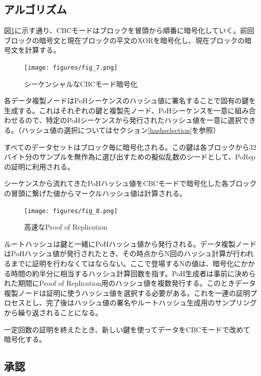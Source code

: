 \documentclass[12pt]{ltjsarticle}
\begin{document}
\subsection{アルゴリズム}
図\ref{fig:encrypt}に示す通り、CBCモードはブロックを冒頭から順番に暗号化していく。前回ブロックの暗号文と現在ブロックの平文のXORを暗号化し、現在ブロックの暗号文を計算する。

\begin{figure}
  \begin{center}
    \centering
    \texttt{[image: figures/fig\_7.png]}
    \caption[図7]{シーケンシャルなCBCモード暗号化\label{fig:encrypt}}
  \end{center}
  \end{figure}

各データ複製ノードはPoHシーケンスのハッシュ値に署名することで固有の鍵を生成する。これはそれぞれの鍵と複製先ノード、PoHシーケンスを一意に組み合わせるので、特定のPoHシーケンスから発行されたハッシュ値を一意に選択できる。（ハッシュ値の選択についてはセクション\ref{hashselection}を参照）

すべてのデータセットはブロック毎に暗号化される。この鍵は各ブロックから32バイト分のサンプルを無作為に選び出すための擬似乱数のシードとして、PoRepの証明に利用される。

シーケンスから流れてきたPoHハッシュ値をCBCモードで暗号化した各ブロックの冒頭に繋げた値からマークルハッシュ値は計算される。

\begin{figure}
  \begin{center}
    \centering
    \texttt{[image: figures/fig\_8.png]}
    \caption[図8]{高速なProof of Replication\label{fig_8}}
  \end{center}
  \end{figure}

ルートハッシュは鍵と一緒にPoHハッシュ値から発行される。データ複製ノードはPoHハッシュ値が発行されたとき、その時点からN回のハッシュ計算が行われるまでに証明を行わなくてはならない。ここで登場するNの値は、暗号化にかかる時間の約半分に相当するハッシュ計算回数を指す。PoH生成者は事前に決められた期間にProof of Replication用のハッシュ値を複数発行する。このときデータ複製ノードは証明に使うハッシュ値を選択する必要がある。これを一連の証明プロセスとし、完了後はハッシュ値の署名やルートハッシュ生成用のサンプリングから繰り返されることになる。

一定回数の証明を終えたとき、新しい鍵を使ってデータをCBCモードで改めて暗号化する。

\subsection{承認}
\end{document}
